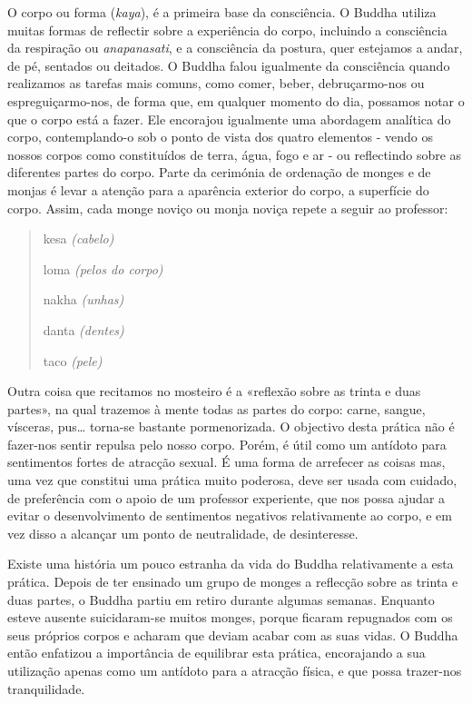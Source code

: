 O corpo ou forma (\emph{kaya}), é a primeira base da consciência. O
Buddha utiliza muitas formas de reflectir sobre a experiência do corpo,
incluindo a consciência da respiração ou \emph{anapanasati}, e a
consciência da postura, quer estejamos a andar, de pé, sentados ou
deitados. O Buddha falou igualmente da consciência quando realizamos as
tarefas mais comuns, como comer, beber, debruçarmo-nos ou
espreguiçarmo-nos, de forma que, em qualquer momento do dia, possamos
notar o que o corpo está a fazer. Ele encorajou igualmente uma abordagem
analítica do corpo, contemplando-o sob o ponto de vista dos quatro
elementos - vendo os nossos corpos como constituídos de terra, água,
fogo e ar - ou reflectindo sobre as diferentes partes do corpo. Parte da
cerimónia de ordenação de monges e de monjas é levar a atenção para a
aparência exterior do corpo, a superfície do corpo. Assim, cada monge
noviço ou monja noviça repete a seguir ao professor:

\begin{quote}
  kesa \emph{(cabelo)}

  loma \emph{(pelos do corpo)}

  nakha \emph{(unhas)}

  danta \emph{(dentes)}

  taco \emph{(pele)}
\end{quote}

Outra coisa que recitamos no mosteiro é a «reflexão sobre as trinta e
duas partes», na qual trazemos à mente todas as partes do corpo: carne,
sangue, vísceras, pus\ldots{} torna-se bastante pormenorizada. O
objectivo desta prática não é fazer-nos sentir repulsa pelo nosso corpo.
Porém, é útil como um antídoto para sentimentos fortes de atracção
sexual. É uma forma de arrefecer as coisas mas, uma vez que constitui
uma prática muito poderosa, deve ser usada com cuidado, de preferência
com o apoio de um professor experiente, que nos possa ajudar a evitar o
desenvolvimento de sentimentos negativos relativamente ao corpo, e em
vez disso a alcançar um ponto de neutralidade, de desinteresse.

Existe uma história um pouco estranha da vida do Buddha relativamente a
esta prática. Depois de ter ensinado um grupo de monges a reflecção
sobre as trinta e duas partes, o Buddha partiu em retiro durante algumas
semanas. Enquanto esteve ausente suicidaram-se muitos monges, porque
ficaram repugnados com os seus próprios corpos e acharam que deviam
acabar com as suas vidas. O Buddha então enfatizou a importância de
equilibrar esta prática, encorajando a sua utilização apenas como um
antídoto para a atracção física, e que possa trazer-nos tranquilidade.

